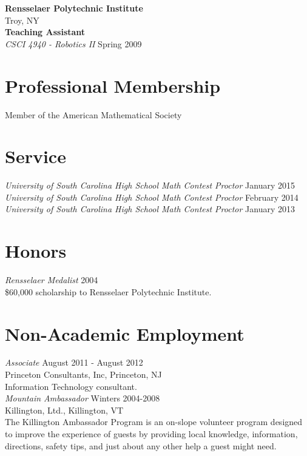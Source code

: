 \documentclass{article}
\begin{document}
  \noindent\textbf{Rensselaer Polytechnic Institute}\\Troy, NY\\

  \noindent\textbf{Teaching Assistant}\\
  \textsl{CSCI 4940 - Robotics II} \hfill Spring 2009\\

  \section*{Professional Membership}
  Member of the American Mathematical Society
  
  \section*{Service}
  \textsl{University of South Carolina High School Math Contest Proctor} \hfill January 2015\\
  \textsl{University of South Carolina High School Math Contest Proctor} \hfill February 2014\\
  \textsl{University of South Carolina High School Math Contest Proctor} \hfill January 2013

  \section*{Honors}
  \textsl{Rensselaer Medalist} \hfill 2004\\
  \$60,000 scholarship to Rensselaer Polytechnic Institute.

  \section*{Non-Academic Employment}             
  \textsl{Associate} \hfill August 2011 - August 2012\\
  Princeton Consultants, Inc, Princeton, NJ\\
  Information Technology consultant.\\

  \noindent\textsl{Mountain Ambassador} \hfill Winters 2004-2008\\
  Killington, Ltd., Killington, VT \\
  The Killington Ambassador Program is an on-slope volunteer program
  designed to improve the experience of guests by providing local knowledge, 
  information, directions, safety tips, and just about any other help a guest might need.
\end{document}
